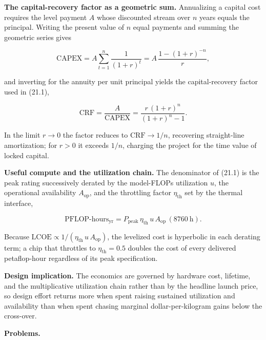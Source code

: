 \documentclass[
  11pt,
  openany,
  oneside]{book}
\begin{document}
\textbf{The capital-recovery factor as a geometric sum.} Annualizing a
capital cost requires the level payment \(A\) whose discounted stream
over \(n\) years equals the principal. Writing the present value of
\(n\) equal payments and summing the geometric series gives

\begin{equation}
\mathrm{CAPEX} = A\sum_{t=1}^{n}\frac{1}{(1+r)^{t}} = A\,\frac{1-(1+r)^{-n}}{r}, \tag{21.4}
\end{equation}

and inverting for the annuity per unit principal yields the
capital-recovery factor used in (21.1),

\begin{equation}
\mathrm{CRF} = \frac{A}{\mathrm{CAPEX}} = \frac{r\,(1+r)^{n}}{(1+r)^{n}-1}. \tag{21.5}
\end{equation}

In the limit \(r\to 0\) the factor reduces to \(\mathrm{CRF}\to 1/n\),
recovering straight-line amortization; for \(r>0\) it exceeds \(1/n\),
charging the project for the time value of locked capital.

\textbf{Useful compute and the utilization chain.} The denominator of
(21.1) is the peak rating successively derated by the model-FLOPs
utilization \(u\), the operational availability \(A_{\mathrm{op}}\), and
the throttling factor \(\eta_{\mathrm{th}}\) set by the thermal
interface,

\begin{equation}
\text{PFLOP-hours}_{\mathrm{yr}} = P_{\mathrm{peak}}\,\eta_{\mathrm{th}}\,u\,A_{\mathrm{op}}\,(8760\ \mathrm{h}). \tag{21.6}
\end{equation}

Because
\(\mathrm{LCOE}\propto 1/(\eta_{\mathrm{th}}\,u\,A_{\mathrm{op}})\), the
levelized cost is hyperbolic in each derating term; a chip that
throttles to \(\eta_{\mathrm{th}}=0.5\) doubles the cost of every
delivered petaflop-hour regardless of its peak specification.

\textbf{Design implication.} The economics are governed by hardware
cost, lifetime, and the multiplicative utilization chain rather than by
the headline launch price, so design effort returns more when spent
raising sustained utilization and availability than when spent chasing
marginal dollar-per-kilogram gains below the cross-over.

\textbf{Problems.}
\end{document}
